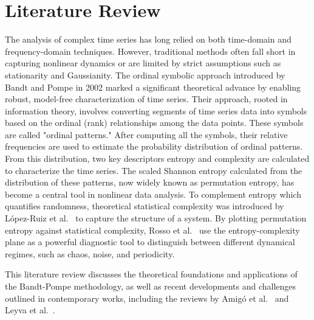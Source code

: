 \chapter{Literature Review}\label{C:lit}

The analysis of complex time series has long relied on both time-domain and frequency-domain techniques. 
However, traditional methods often fall short in capturing nonlinear dynamics or are limited by strict assumptions such as stationarity and Gaussianity. 
The ordinal symbolic approach introduced by Bandt and Pompe in 2002 marked a significant theoretical advance by enabling robust, model-free characterization of time series. 
Their approach, rooted in information theory, involves converting segments of time series data into symbols based on the ordinal (rank) relationships among the data points.
These symbols are called "ordinal patterns." After computing all the symbols, their relative frequencies are used to estimate the probability distribution of ordinal patterns. From this distribution, two key descriptors entropy and complexity are calculated to characterize the time series.
The scaled Shannon entropy calculated from the distribution of these patterns, now widely known as permutation entropy, has become a central tool in nonlinear data analysis.
To complement entropy which quantifies randomness, theoretical statistical complexity was introduced  by López-Ruiz et al.~\cite{lopez1995statistical} to capture the structure of a system. By plotting permutation entropy against statistical complexity, Rosso et al.~\cite{Rosso2007} use the entropy-complexity plane as a powerful diagnostic tool to distinguish between different dynamical regimes, such as chaos, noise, and periodicity.


This literature review discusses the theoretical foundations and applications of the Bandt-Pompe methodology, as well as recent developments and challenges outlined in contemporary works, including the reviews by Amigó et al.~\cite{amigo2023ordinal} and Leyva et al.~\cite{Leyva2022}.



